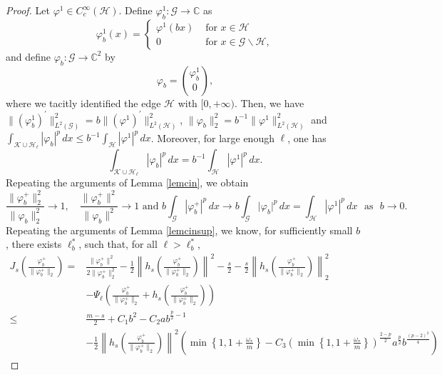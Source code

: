 \documentclass[11pt]{amsart}
\newcommand{\abs}[1]{\lvert#1\rvert}
\newcommand{\norm}[1]{\lVert#1\rVert}
\newcommand{\G}{\mathcal{G}}
\newcommand{\K}{\mathcal{K}}
\numberwithin{equation}{section}
\begin{document}
\begin{proof}
    Let $\varphi^1 \in C_c^\infty(\mathcal{H})$. Define $\varphi_{b}^1: \G \to \mathbb{C}$ as
$$
    \varphi_{b}^1(x)= \begin{cases}\varphi^1(bx) & \text { for }  x\in\mathcal{H} \\0 & \text { for } x \in \G\backslash\mathcal{H}, \end{cases}
$$
and define $\varphi_{b}: \G \to \mathbb{C}^2$ by
$$\varphi_{b} = \binom{\varphi_{b}^1}{0},$$
where we tacitly identified the edge $\mathcal{H}$ with $[0, +\infty)$.
Then, we have $\norm{\left(\varphi_{b}^1\right)^\prime}_{L^2(\G)}^2 = b\norm{\left(\varphi^1\right)^\prime}_{L^2(\mathcal{H})}^2$, $\norm{\varphi_{b}}_2^2 = b^{-1}\norm{\varphi^1}_{L^2(\mathcal{H})}^2$ and $\int_{\K\cup\mathcal{H}_\ell}|\varphi_{b}|^{p}\,dx  \leq b^{-1}\int_{\mathcal{H}}|\varphi^1|^{p}\,dx$. Moreover, for large enough $\ell$, one has
\[
    \int_{\K\cup\mathcal{H}_\ell}|\varphi_{b}|^{p}\,dx = b^{-1}\int_{\mathcal{H}}|\varphi^1|^{p}\,dx.
\]
Repeating the arguments of Lemma \ref{lemcin}, we obtain
\begin{equation*}
  \frac{\norm{\varphi_b^+}^2_2}{\norm{\varphi_b}^2_2} \to 1, \quad \frac{\norm{\varphi_b^+}^2}{\norm{\varphi_b}^2} \to 1 \text{ and } b\int_{\G}|\varphi_{b}^+|^{p}\,dx \to b\int_{\G}\abs{\varphi_b}^{p}\,dx = \int_{\mathcal{H}}|\varphi^1|^{p}\,dx\,\, \text{ as }\,\, b \to 0.
\end{equation*}
Repeating the arguments of Lemma \ref{lemcinsup}, we know,
for sufficiently small $b$ , there exists $\ell^*_b$, such that, for all $\ell > \ell^*_b$,
\begin{equation*}
            \begin{aligned}
                J_{s}(\frac{\varphi_b^+}{\norm{\varphi_b^+}_2}) =& \frac{\norm{\varphi_b^+}^2}{2\norm{\varphi_b^+}^2_2}-\frac{1}{2}\left\lVert h_s\left(\frac{\varphi_b^+}{\norm{\varphi_b^+}_2}\right) \right\rVert^2 - \frac{s}{2} - \frac{s}{2}\left\lVert h_s\left(\frac{\varphi_b^+}{\norm{\varphi_b^+}_2}\right) \right\rVert_2^2\\
                &- \Psi_\ell\left(\frac{\varphi_b^+}{\norm{\varphi_b^+}_2}+h_s\left(\frac{\varphi_b^+}{\norm{\varphi_b^+}_2}\right)\right)\\
                \leq& \frac{m-s}{2}+ C_1b^2 - C_2ab^{\frac{p}{2}-1} \\&- \frac{1}{2}\left\lVert h_s\left(\frac{\varphi_b^+}{\norm{\varphi_b^+}_2}\right)\right\rVert^2\left(\min\left\{1, 1 + \frac{\omega_*}{m}\right\} - C_3 \left(\min\left\{1, 1 + \frac{\omega_*}{m}\right\}\right)^\frac{2-p}{2}a^\frac{p}{2}b^\frac{(p-2)^2}{4}\right)

\end{aligned}
\end{equation*}
\end{proof}
\end{document}
